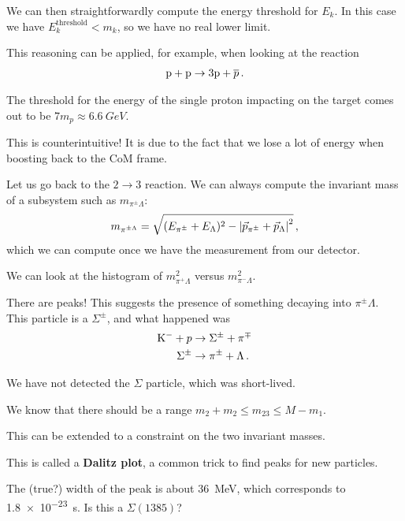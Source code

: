 \documentclass[main.tex]{subfiles}
\begin{document}
We can then straightforwardly compute the energy threshold for \(E_k\). 
In this case we have \(E_k^{\text{threshold}} < m_k\), so we have no real lower limit. 

This reasoning can be applied, for example, when looking at the reaction
%
\begin{align}
\ce{p} + \ce{p} \to 3 \ce{p} + \overline{p}
\,.
\end{align}

The threshold for the energy of the single proton impacting on the target comes out to be \(7 m_p \approx \SI{6.6}{GeV}\).

This is counterintuitive! It is due to the fact that we lose a lot of energy when boosting back to the CoM frame. 

Let us go back to the \(2 \to 3\) reaction. 
We can always compute the invariant mass of a subsystem such as \(m_{\pi^{\pm}\Lambda }\): 
%
\begin{align}
m_{\pi^{\pm \Lambda }} = \sqrt{(E_{\pi^{\pm}} + E_\Lambda )^2 - \abs{\vec{p}_{\pi^{\pm }} + \vec{p}_\Lambda }^2}
\,,
\end{align}
%
which we can compute once we have the measurement from our detector. 


We can look at the histogram of \(m_{\pi^{+}\Lambda }^2\) versus \(m_{\pi^{-}\Lambda }^2\). 

There are peaks! 
This suggests the presence of something decaying into \(\pi^{\pm }\Lambda \).
This particle is a \(\Sigma^{\pm}\), and what happened was 
%
\begin{align}
\ce{K}^{-} + p &\to \Sigma^{\pm} + \pi^{\mp}  \\
\Sigma^{\pm} &\to \pi^{\pm} + \Lambda 
\,.
\end{align}

We have not detected the \(\Sigma \) particle, which was short-lived. 

We know that there should be a range \(m_2 + m_2 \leq m_{23} \leq M - m_1 \). 

This can be extended to a constraint on the two invariant masses. 

This is called a \textbf{Dalitz plot}, a common trick to find peaks for new particles. 

The (true?) width of the peak is about \SI{36}{MeV}, which corresponds to \SI{1.8e-23}{s}. 
Is this a \(\Sigma (1385)\)? 

\end{document}
